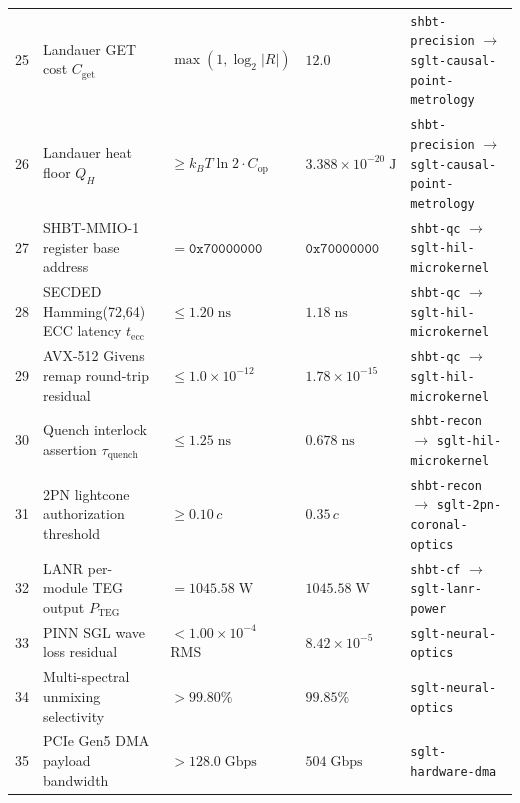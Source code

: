 \documentclass[10pt,twocolumn]{IEEEtran}
\begin{document}
\begin{table}[t]
\begin{tabular}{@{}cp{4.3cm}p{3.5cm}p{3.3cm}p{3.6cm}@{}}
25 & Landauer GET cost $C_{\mathrm{get}}$ & $\max(1,\log_2|R|)$ & $12.0$ & \texttt{shbt-precision} $\rightarrow$ \texttt{sglt-causal-point-metrology} \\
26 & Landauer heat floor $Q_H$ & $\geq k_BT\ln2\cdot C_{\mathrm{op}}$ & $3.388\times10^{-20}\;\mathrm{J}$ & \texttt{shbt-precision} $\rightarrow$ \texttt{sglt-causal-point-metrology} \\
27 & SHBT-MMIO-1 register base address & $=\mathtt{0x70000000}$ & $\mathtt{0x70000000}$ & \texttt{shbt-qc} $\rightarrow$ \texttt{sglt-hil-microkernel} \\
28 & SECDED Hamming(72,64) ECC latency $t_{\mathrm{ecc}}$ & $\leq1.20\;\mathrm{ns}$ & $1.18\;\mathrm{ns}$ & \texttt{shbt-qc} $\rightarrow$ \texttt{sglt-hil-microkernel} \\
29 & AVX-512 Givens remap round-trip residual & $\leq1.0\times10^{-12}$ & $1.78\times10^{-15}$ & \texttt{shbt-qc} $\rightarrow$ \texttt{sglt-hil-microkernel} \\
30 & Quench interlock assertion $\tau_{\mathrm{quench}}$ & $\leq1.25\;\mathrm{ns}$ & $0.678\;\mathrm{ns}$ & \texttt{shbt-recon} $\rightarrow$ \texttt{sglt-hil-microkernel} \\
31 & 2PN lightcone authorization threshold & $\geq0.10\,c$ & $0.35\,c$ & \texttt{shbt-recon} $\rightarrow$ \texttt{sglt-2pn-coronal-optics} \\
32 & LANR per-module TEG output $P_{\mathrm{TEG}}$ & $=1045.58\;\mathrm{W}$ & $1045.58\;\mathrm{W}$ & \texttt{shbt-cf} $\rightarrow$ \texttt{sglt-lanr-power} \\
\midrule
33 & PINN SGL wave loss residual & $<1.00\times10^{-4}$ RMS & $8.42\times10^{-5}$ & \texttt{sglt-neural-optics} \\
34 & Multi-spectral unmixing selectivity & $>99.80\%$ & $99.85\%$ & \texttt{sglt-neural-optics} \\
35 & PCIe Gen5 DMA payload bandwidth & $>128.0\;\mathrm{Gbps}$ & $504\;\mathrm{Gbps}$ & \texttt{sglt-hardware-dma} \\
\bottomrule
\end{tabular}
\end{table}
\end{document}

